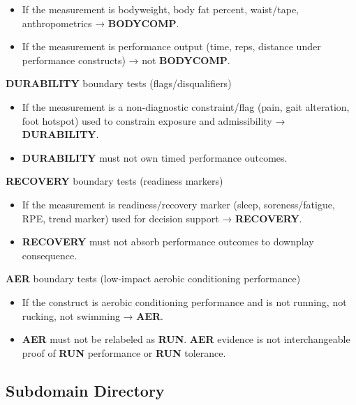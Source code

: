 \documentclass[10pt]{article}
\begin{document}
\begin{itemize}
\item If the measurement is bodyweight, body fat percent, waist/tape, anthropometrics → \textbf{BODYCOMP}.
\item If the measurement is performance output (time, reps, distance under performance constructs) → not \textbf{BODYCOMP}.
\end{itemize}

\textbf{DURABILITY} boundary tests (flags/disqualifiers)

\begin{itemize}
\item If the measurement is a non-diagnostic constraint/flag (pain, gait alteration, foot hotspot) used to constrain exposure and admissibility → \textbf{DURABILITY}.
\item \textbf{DURABILITY} must not own timed performance outcomes.
\end{itemize}

\textbf{RECOVERY} boundary tests (readiness markers)

\begin{itemize}
\item If the measurement is readiness/recovery marker (sleep, soreness/fatigue, RPE, trend marker) used for decision support → \textbf{RECOVERY}.
\item \textbf{RECOVERY} must not absorb performance outcomes to downplay consequence.
\end{itemize}

\textbf{AER} boundary tests (low-impact aerobic conditioning performance)

\begin{itemize}
\item If the construct is aerobic conditioning performance and is not running, not rucking, not swimming → \textbf{AER}.
\item \textbf{AER} must not be relabeled as \textbf{RUN}. \textbf{AER} evidence is not interchangeable proof of \textbf{RUN} performance or \textbf{RUN} tolerance.
\end{itemize}

\newpage

\subsection*{Subdomain Directory}
{}
\end{document}
